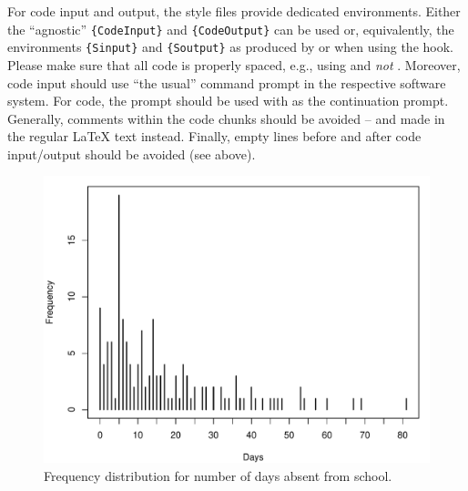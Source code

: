 \documentclass[article]{jss}
\newcommand{\fct}[1]{\code{#1()}}
\begin{document}
\begin{leftbar}
For code input and output, the style files provide dedicated environments.
Either the ``agnostic'' \verb|{CodeInput}| and \verb|{CodeOutput}| can be used
or, equivalently, the environments \verb|{Sinput}| and \verb|{Soutput}| as
produced by \fct{Sweave} or  when using the 
hook. Please make sure that all code is properly spaced, e.g., using
 and \emph{not} . Moreover, code input should
use ``the usual'' command prompt in the respective software system. For
 code, the prompt  should be used with  as
the continuation prompt. Generally, comments within the code chunks should be
avoided -- and made in the regular {\LaTeX} text instead. Finally, empty lines
before and after code input/output should be avoided (see above).
\end{leftbar}

\begin{figure}[t!]
\centering
\includegraphics{article-visualization}
\caption{\label{fig:quine} Frequency distribution for number of days absent
from school.}
\end{figure}
\end{document}
